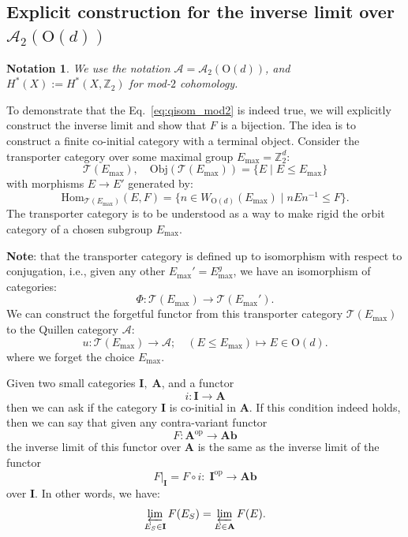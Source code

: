 \documentclass[aps,prx,reprint,superscriptaddress,twocolumn,amsmath,amssymb,amsfonts, nofootinbib]{revtex4-2}
\newcommand{\qa}{\mathcal{A}_{2}}
\newcommand{\Z}{\mathbb{Z}}
\theoremstyle{apsstyle}
\newtheorem{notation}{Notation}
\begin{document}
\subsection{Explicit construction for the inverse limit over $\qa(\mathrm{O}(d))$}
\label{app:symm_ring}

\begin{notation} We use the notation $\mathcal{A}=\qa(\mathrm{O}(d))$, and $H^{*}(X):=H^{*}(X, \Z_{2})$ for mod-$2$ cohomology. 
\end{notation}
\bigskip 

To demonstrate that the Eq.~\ref{eq:qisom_mod2} is indeed true, we will explicitly construct the inverse limit and show that $F$ is a bijection. The idea is to construct a finite co-initial category with a terminal object. Consider the transporter category over some maximal group $E_{\mathrm{max}}=\mathbb{Z}_{2}^{d}$:$$
\mathcal{T}(E_{\mathrm{max}}),\quad \mathrm{Obj}(\mathcal{T}(E_{\mathrm{max}}))=\{ E \;|\; E\leq E_{\mathrm{max}} \}
$$with morphisms $E \to E'$ generated by:$$
\mathrm{Hom}_{\mathcal{T}(E_{\mathrm{max}})}(E, F) = \{n\in W_{\mathrm{O}(d)}(E_{\mathrm{max}})\;|\; nEn^{-1}\leq F\}.
$$The transporter category is to be understood as a way to make rigid the orbit category of a chosen subgroup $E_{\mathrm{max}}$. 

\bigskip 
\noindent \textbf{Note}: that the transporter category is defined up to isomorphism with respect to conjugation, i.e., given any other $E_{\mathrm{max}}' = E_{\mathrm{max}}^{g}$, we have an isomorphism of categories: $$\Phi: \mathcal{T}(E_{\mathrm{max}}) \to \mathcal{T}(E_{\mathrm{max}}').$$
We can construct the forgetful functor from this transporter category $\mathcal{T}(E_{\mathrm{max}})$ to the Quillen category $\mathcal{A}$:$$
u: \mathcal{T}(E_{\mathrm{max}}) \to \mathcal{A};\quad (E\leq E_{\mathrm{max}}) \mapsto E\in \mathrm{O}(d).
$$where we forget the choice $E_{\mathrm{max}}$.

\bigskip 

\noindent Given two small categories $\mathbf{I},\;\mathbf{A}$, and a functor $$
i:\mathbf{I} \to \mathbf{A}
$$then we can ask if the category $\mathbf{I}$ is co-initial in $\mathbf{A}$. If this condition indeed holds, then we can say that given any contra-variant functor $$
F: \mathbf{A}^{\mathrm{op}} \to \mathbf{Ab}
$$the inverse limit of this functor over $\mathbf{A}$ is the same as the inverse limit of the functor $$
F\vert_{\mathbf{I}}=F\circ i:\; \mathbf{I}^{\mathrm{op}} \to \mathbf{Ab}
$$over $\mathbf{I}$. In other words, we have: $$\varprojlim_{E_{S}\in \mathbf{I}} F(E_{S}) = \varprojlim_{E\in \mathbf{A}} F(E).$$
\end{document}
